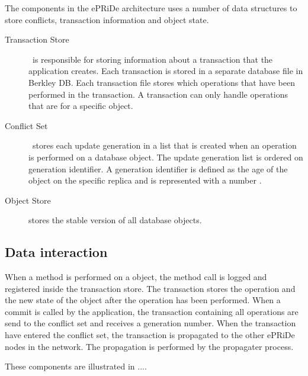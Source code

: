 The components in the ePRiDe architecture uses a number of data structures to store conflicts, transaction information and object state. 
\begin{description}
	
	\item[Transaction Store] \
	is responsible for storing information about a transaction that the application creates. Each transaction is stored in a separate database file in Berkley DB.  Each transaction file stores which operations that have been performed in the transaction. A transaction can only handle operations that are for a specific object.
	
	\item[Conflict Set] \
	stores each update generation in a list that is created when an operation is performed on a database object. The update generation list is ordered on generation identifier. A generation identifier is defined as the age of the object on the specific replica and is represented with a number \cite[]{Syber2007}.
	
	\item[Object Store] stores the stable version of all database objects.
\end{description}
    
 


\subsection{Data interaction} %
\label{sub:data_interaction}

When a method is performed on a object, the method call is logged and registered inside the transaction store. The transaction stores the operation and the new state of the object after the operation has been performed. When a commit is called by the application, the transaction containing all operations are send to the conflict set and receives a generation number. When the transaction have entered the conflict set, the transaction is propagated to the other ePRiDe nodes in the network. The propagation is performed by the propagater process. 

These components are illustrated in ....

